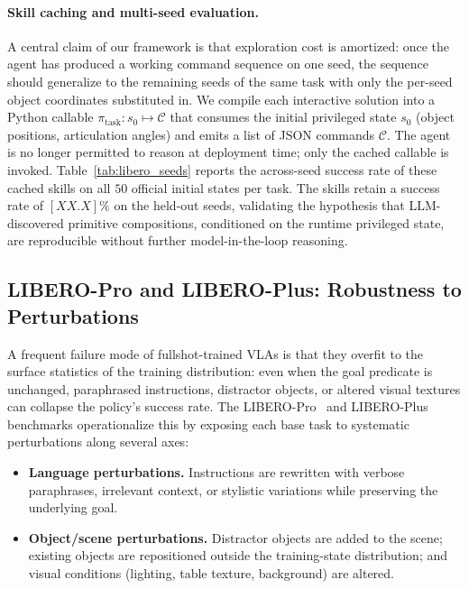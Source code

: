 \documentclass{article}
\begin{document}
	\paragraph{Skill caching and multi-seed evaluation.} A central
	claim of our framework is that exploration cost is amortized: once
	the agent has produced a working command sequence on one seed,
	the sequence should generalize to the remaining seeds of the same
	task with only the per-seed object coordinates substituted in.
	We compile each interactive solution into a Python callable
	$\pi_\text{task}: s_0 \mapsto \mathcal{C}$ that consumes the
	initial privileged state $s_0$ (object positions, articulation
	angles) and emits a list of JSON commands $\mathcal{C}$.
	The agent is no longer permitted to reason at deployment time;
	only the cached callable is invoked.
	Table~\ref{tab:libero_seeds} reports the across-seed success rate
	of these cached skills on all $50$ official initial states per
	task. The skills retain a success rate of $[\textit{XX.X}]\%$ on
	the held-out seeds, validating the hypothesis that LLM-discovered
	primitive compositions, conditioned on the runtime privileged
	state, are reproducible without further model-in-the-loop
	reasoning.

\subsection{LIBERO-Pro and LIBERO-Plus: Robustness to Perturbations}
\label{sec:exp:robustness}

	A frequent failure mode of fullshot-trained VLAs is that they
	overfit to the surface statistics of the training distribution:
	even when the goal predicate is unchanged, paraphrased
	instructions, distractor objects, or altered visual textures can
	collapse the policy's success rate. The
	LIBERO-Pro~\citep{Lagrange1788} and LIBERO-Plus~\citep{Lagrange1788}
	benchmarks operationalize this by exposing each base task to
	systematic perturbations along several axes:

	\begin{itemize}
	\item \textbf{Language perturbations.} Instructions are
	rewritten with verbose paraphrases, irrelevant context, or
	stylistic variations while preserving the underlying goal.
	\item \textbf{Object/scene perturbations.} Distractor objects
	are added to the scene; existing objects are repositioned outside
	the training-state distribution; and visual conditions
	(lighting, table texture, background) are altered.
	\end{itemize}
\end{document}
